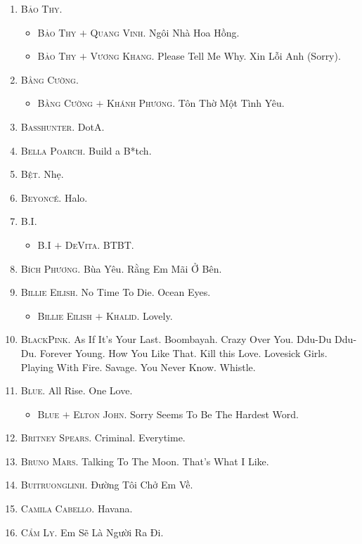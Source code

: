 \documentclass[oneside]{book}
\numberwithin{equation}{section}
\begin{document}
\begin{enumerate}
	\item \textsc{Bảo Thy.}
	\begin{itemize}
		\item \textsc{Bảo Thy $+$ Quang Vinh.} Ngôi Nhà Hoa Hồng.
		\item \textsc{Bảo Thy $+$ Vương Khang.} Please Tell Me Why. Xin Lỗi Anh (Sorry).
	\end{itemize}
	\item \textsc{Bằng Cường.}
	\begin{itemize}
		\item \textsc{Bằng Cường $+$ Khánh Phương.} Tôn Thờ Một Tình Yêu.
	\end{itemize}
	\item \textsc{Basshunter.} DotA.
	\item \textsc{Bella Poarch.} Build a B*tch.
	\item \textsc{Bệt.} Nhẹ.
	\item \textsc{Beyonc\'e.} Halo.
	\item \textsc{B.I.}
	\begin{itemize}
		\item \textsc{B.I $+$ DeVita.} BTBT.
	\end{itemize}
	\item \textsc{Bích Phương.} Bùa Yêu. Rằng Em Mãi Ở Bên.
	\item \textsc{Billie Eilish.} No Time To Die. Ocean Eyes.
	\begin{itemize}
		\item \textsc{Billie Eilish $+$ Khalid.} Lovely.
	\end{itemize}
	\item \textsc{BlackPink.} As If It's Your Last. Boombayah. Crazy Over You. Ddu-Du Ddu-Du. Forever Young. How You Like That. Kill this Love. Lovesick Girls. Playing With Fire. Savage. You Never Know. Whistle.
	\item \textsc{Blue.} All Rise. One Love.
	\begin{itemize}
		\item \textsc{Blue $+$ Elton John.} Sorry Seems To Be The Hardest Word.
	\end{itemize}
	\item \textsc{Britney Spears.} Criminal. Everytime.
	\item \textsc{Bruno Mars.} Talking To The Moon. That's What I Like.
	\item \textsc{Buitruonglinh.} Đường Tôi Chở Em Về.
	\item \textsc{Camila Cabello.} Havana.
	\item \textsc{Cẩm Ly.} Em Sẽ Là Người Ra Đi.

\end{enumerate}
\end{document}
